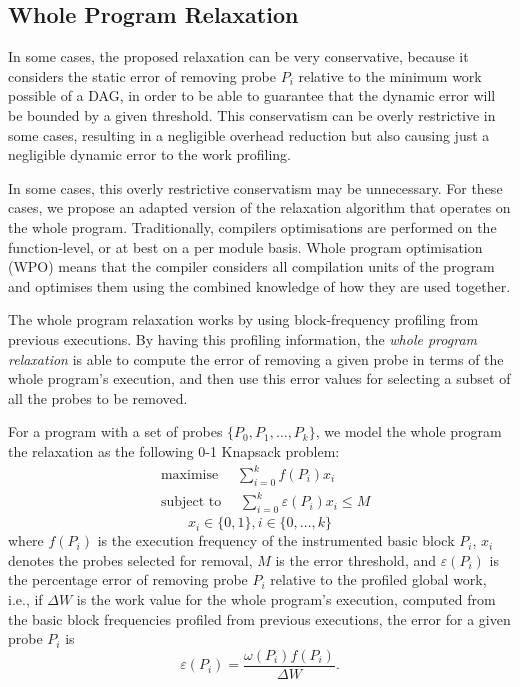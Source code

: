 \documentclass[sigplan,10pt]{acmart}
\theoremstyle{definition}
\begin{document}
\subsection{Whole Program Relaxation}

In some cases, the proposed relaxation can be very conservative, because it considers the static error of removing probe $P_i$ relative to the minimum work possible of a DAG, in order to be able to guarantee that the dynamic error will be bounded by a given threshold.
This conservatism can be overly restrictive in some cases, resulting in a negligible overhead reduction but also causing just a negligible dynamic error to the work profiling.

In some cases, this overly restrictive conservatism may be unnecessary.
For these cases, we propose an adapted version of the relaxation algorithm that operates on the whole program.
Traditionally, compilers optimisations are performed on the function-level, or at best on a per module basis.
Whole program optimisation (WPO) means that the compiler considers all compilation units of the program and optimises them using the combined knowledge of how they are used together.

The whole program relaxation works by using block-frequency profiling from previous executions.
By having this profiling information, the \textit{whole program relaxation} is able to compute the error of removing a given probe in terms of the whole program's execution,
and then use this error values for selecting a subset of all the probes to be removed.

For a program with a set of probes $\{P_0, P_1, \ldots, P_k\}$, we model the whole program the relaxation as the following 0-1 Knapsack problem:
\begin{equation*}
\begin{aligned}
& \textrm{maximise }\quad \sum_{i=0}^{k} f(P_i)x_i \\
& \textrm{subject to }\quad \sum_{i=0}^{k} \varepsilon(P_i)x_i \leq M
\end{aligned}
\end{equation*}
\[
x_i\in\{0,1\}, i\in\{0,\ldots,k\}
\]
where $f(P_i)$ is the execution frequency of the instrumented basic block $P_i$, $x_i$ denotes the probes selected for removal, $M$ is the error threshold, and $\varepsilon(P_i)$ is the percentage error of removing probe $P_i$ relative to the profiled global work, i.e.,
if $\Delta W$ is the work value for the whole program's execution, computed from the basic block frequencies profiled from previous executions, the error for a given probe $P_i$ is
\[
\varepsilon(P_i) = \frac{\omega(P_i)f(P_i)}{\Delta W}.
\]
\end{document}
